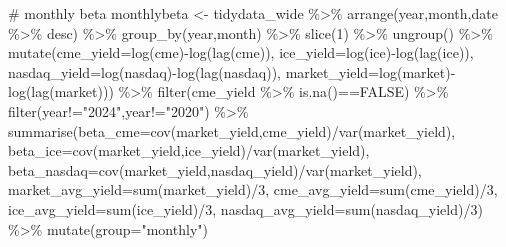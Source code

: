 \documentclass[
  letterpaper,
  DIV=11,
  numbers=noendperiod]{scrreprt}
\newenvironment{Shaded}{\begin{snugshade}}{\end{snugshade}}
\newcommand{\AttributeTok}[1]{\textcolor[rgb]{0.40,0.45,0.13}{#1}}
\newcommand{\CommentTok}[1]{\textcolor[rgb]{0.37,0.37,0.37}{#1}}
\newcommand{\ConstantTok}[1]{\textcolor[rgb]{0.56,0.35,0.01}{#1}}
\newcommand{\DecValTok}[1]{\textcolor[rgb]{0.68,0.00,0.00}{#1}}
\newcommand{\FunctionTok}[1]{\textcolor[rgb]{0.28,0.35,0.67}{#1}}
\newcommand{\NormalTok}[1]{\textcolor[rgb]{0.00,0.23,0.31}{#1}}
\newcommand{\OtherTok}[1]{\textcolor[rgb]{0.00,0.23,0.31}{#1}}
\newcommand{\SpecialCharTok}[1]{\textcolor[rgb]{0.37,0.37,0.37}{#1}}
\newcommand{\StringTok}[1]{\textcolor[rgb]{0.13,0.47,0.30}{#1}}
\begin{document}
\begin{Shaded}
\begin{Highlighting}[]
\CommentTok{\# monthly beta}
\NormalTok{monthlybeta }\OtherTok{\textless{}{-}}\NormalTok{ tidydata\_wide }\SpecialCharTok{\%\textgreater{}\%} 
  \FunctionTok{arrange}\NormalTok{(year,month,date }\SpecialCharTok{\%\textgreater{}\%}\NormalTok{ desc) }\SpecialCharTok{\%\textgreater{}\%} 
  \FunctionTok{group\_by}\NormalTok{(year,month) }\SpecialCharTok{\%\textgreater{}\%} 
  \FunctionTok{slice}\NormalTok{(}\DecValTok{1}\NormalTok{) }\SpecialCharTok{\%\textgreater{}\%} 
  \FunctionTok{ungroup}\NormalTok{() }\SpecialCharTok{\%\textgreater{}\%} 
  \FunctionTok{mutate}\NormalTok{(}\AttributeTok{cme\_yield=}\FunctionTok{log}\NormalTok{(cme)}\SpecialCharTok{{-}}\FunctionTok{log}\NormalTok{(}\FunctionTok{lag}\NormalTok{(cme)),}
         \AttributeTok{ice\_yield=}\FunctionTok{log}\NormalTok{(ice)}\SpecialCharTok{{-}}\FunctionTok{log}\NormalTok{(}\FunctionTok{lag}\NormalTok{(ice)),}
         \AttributeTok{nasdaq\_yield=}\FunctionTok{log}\NormalTok{(nasdaq)}\SpecialCharTok{{-}}\FunctionTok{log}\NormalTok{(}\FunctionTok{lag}\NormalTok{(nasdaq)),}
         \AttributeTok{market\_yield=}\FunctionTok{log}\NormalTok{(market)}\SpecialCharTok{{-}}\FunctionTok{log}\NormalTok{(}\FunctionTok{lag}\NormalTok{(market))) }\SpecialCharTok{\%\textgreater{}\%} 
  \FunctionTok{filter}\NormalTok{(cme\_yield }\SpecialCharTok{\%\textgreater{}\%} \FunctionTok{is.na}\NormalTok{()}\SpecialCharTok{==}\ConstantTok{FALSE}\NormalTok{) }\SpecialCharTok{\%\textgreater{}\%} 
  \FunctionTok{filter}\NormalTok{(year}\SpecialCharTok{!=}\StringTok{"2024"}\NormalTok{,year}\SpecialCharTok{!=}\StringTok{"2020"}\NormalTok{) }\SpecialCharTok{\%\textgreater{}\%} 
  \FunctionTok{summarise}\NormalTok{(}\AttributeTok{beta\_cme=}\FunctionTok{cov}\NormalTok{(market\_yield,cme\_yield)}\SpecialCharTok{/}\FunctionTok{var}\NormalTok{(market\_yield),}
            \AttributeTok{beta\_ice=}\FunctionTok{cov}\NormalTok{(market\_yield,ice\_yield)}\SpecialCharTok{/}\FunctionTok{var}\NormalTok{(market\_yield),}
            \AttributeTok{beta\_nasdaq=}\FunctionTok{cov}\NormalTok{(market\_yield,nasdaq\_yield)}\SpecialCharTok{/}\FunctionTok{var}\NormalTok{(market\_yield),}
            \AttributeTok{market\_avg\_yield=}\FunctionTok{sum}\NormalTok{(market\_yield)}\SpecialCharTok{/}\DecValTok{3}\NormalTok{,}
            \AttributeTok{cme\_avg\_yield=}\FunctionTok{sum}\NormalTok{(cme\_yield)}\SpecialCharTok{/}\DecValTok{3}\NormalTok{,}
            \AttributeTok{ice\_avg\_yield=}\FunctionTok{sum}\NormalTok{(ice\_yield)}\SpecialCharTok{/}\DecValTok{3}\NormalTok{,}
            \AttributeTok{nasdaq\_avg\_yield=}\FunctionTok{sum}\NormalTok{(nasdaq\_yield)}\SpecialCharTok{/}\DecValTok{3}\NormalTok{) }\SpecialCharTok{\%\textgreater{}\%} 
  \FunctionTok{mutate}\NormalTok{(}\AttributeTok{group=}\StringTok{"monthly"}\NormalTok{)}


\end{Highlighting}
\end{Shaded}
\end{document}
